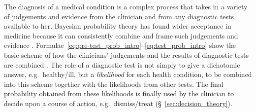 \documentclass[%
]{frontiersSCNS-nologo} %
\newcommand*{\sect}{\S} %
\newcommand*{\eg}{e.g.}
\renewcommand*{\|}{\mathpunct{|}}%
\begin{document}
The diagnosis of a medical condition is a complex process that takes in a
variety of judgements and evidence from the clinician and from any
diagnostic tests available to her. Bayesian probability theory has found
wider acceptance in medicine because it can consistently combine and frame
such judgements and evidence
\citep{goodman1999,davidoff1999,greenland1998}.
Formulae~\eqref{eq:pre-test_prob_intro}--\eqref{eq:test_prob_intro} show
the basic scheme of how the clinicians' judgements and the results of
diagnostic tests are combined \citep{soxetal1988_r2013}. The role of a
diagnostic test is not simply to give a dichotomic answer, \eg\
healthy/ill, but a \emph{likelihood} for each health condition, to be
combined into this scheme together with the likelihoods from other tests.
The final probability obtained from these likelihoods is finally used by
the clinician to decide upon a course of action, \eg\ dismiss/treat
(\sect~\ref{sec:decision_theory}).
\end{document}
